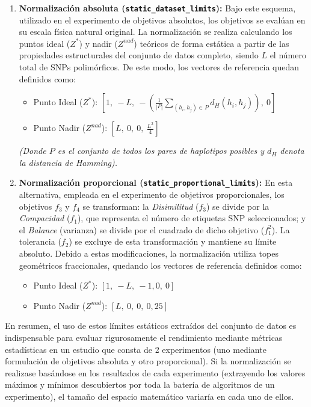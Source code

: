 \begin{enumerate}
    \item \textbf{Normalización absoluta (\texttt{static\_dataset\_limits}):} Bajo este esquema, utilizado en el experimento de objetivos absolutos, los objetivos se evalúan en su escala física natural original. La normalización se realiza calculando los puntos ideal ($Z^*$) y nadir ($Z^{nad}$) teóricos de forma estática a partir de las propiedades estructurales del conjunto de datos completo, siendo $L$ el número total de SNPs polimórficos. De este modo, los vectores de referencia quedan definidos como:
    \begin{itemize}
        \item Punto Ideal ($Z^*$): $\left[1,\ -L,\ -\left(\frac{1}{|P|} \sum_{(h_i, h_j) \in P} d_H(h_i, h_j)\right),\ 0\right]$
        \item Punto Nadir ($Z^{nad}$): $\left[L,\ 0,\ 0,\ \frac{L^2}{4}\right]$
    \end{itemize}
    \textit{(Donde $P$ es el conjunto de todos los pares de haplotipos posibles y $d_H$ denota la distancia de Hamming).}

    \item \textbf{Normalización proporcional (\texttt{static\_proportional\_limits}):} En esta alternativa, empleada en el experimento de objetivos proporcionales, los objetivos $f_3$ y $f_4$ se transforman: la \textit{Disimilitud} ($f_3$) se divide por la \textit{Compacidad} ($f_1$), que representa el número de etiquetas SNP seleccionados; y el \textit{Balance} (varianza) se divide por el cuadrado de dicho objetivo ($f_1^2$). La tolerancia ($f_2$) se excluye de esta transformación y mantiene su límite absoluto. Debido a estas modificaciones, la normalización utiliza topes geométricos fraccionales, quedando los vectores de referencia definidos como:
    \begin{itemize}
        \item Punto Ideal ($Z^*$): $\left[1,\ -L,\ -1{,}0,\ 0\right]$
        \item Punto Nadir ($Z^{nad}$): $\left[L,\ 0,\ 0,\ 0{,}25\right]$
    \end{itemize}
\end{enumerate}



En resumen, el uso de estos límites estáticos extraídos del conjunto de datos es indispensable para evaluar rigurosamente el rendimiento mediante métricas estadísticas en un estudio que consta de 2 experimentos (uno mediante formulación de objetivos absoluta y otro proporcional). Si la normalización se realizase basándose en los resultados de cada experimento (extrayendo los valores máximos y mínimos descubiertos por toda la batería de algoritmos de un experimento), el tamaño del espacio matemático variaría en cada uno de ellos.

